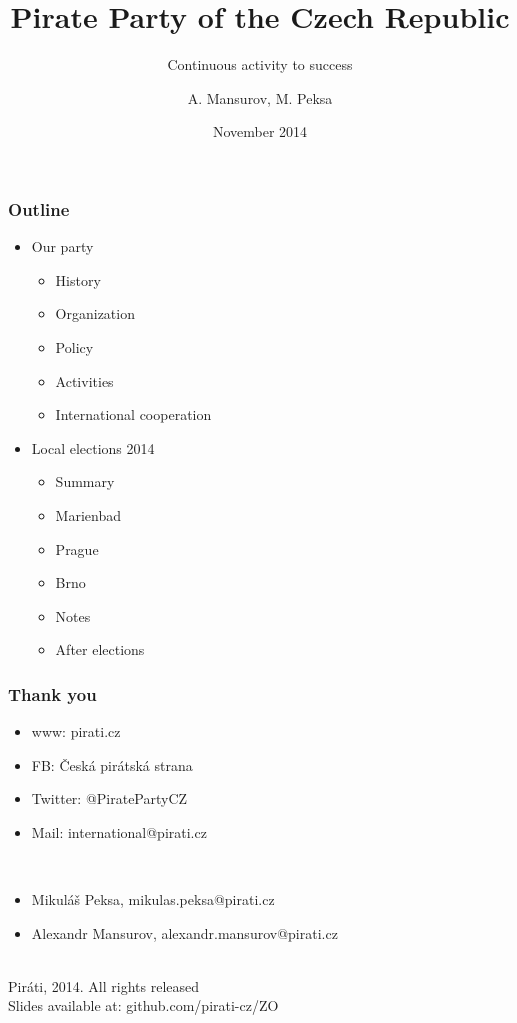 \documentclass[sans]{beamer}
\begin{document}
	\title{Pirate Party of the Czech Republic}
	\subtitle{Continuous activity to success}
	\author{A. Mansurov, M. Peksa}
	\date{November 2014}
	
	\frame{\titlepage}
	\begin{frame}
		\frametitle{Outline}
		\begin{itemize}
			\item Our party
				\begin{itemize}
					\item History
					\item Organization
					\item Policy
					\item Activities
					\item International cooperation
				\end{itemize}
			\item Local elections 2014
				\begin{itemize}
					\item Summary
					\item Marienbad
					\item Prague
					\item Brno
					\item Notes
					\item After elections
				\end{itemize}
		\end{itemize}
	\end{frame}
	
	
	\begin{frame}
		\frametitle{Thank you}
		\begin{itemize}
		\item www: pirati.cz
		\item FB: \v{C}esk\'a pir\'atsk\'a strana
		\item Twitter: @PiratePartyCZ
		\item Mail: international@pirati.cz
		\end{itemize}
		~\\
		\begin{itemize}
		\item Mikul\'a\v{s} Peksa, mikulas.peksa@pirati.cz
		\item Alexandr Mansurov, alexandr.mansurov@pirati.cz
		\end{itemize}
		~\\
		\textcopyleft Pir\'ati, 2014. All rights released\\
		Slides available at: github.com/pirati-cz/ZO
	\end{frame}
\end{document}

